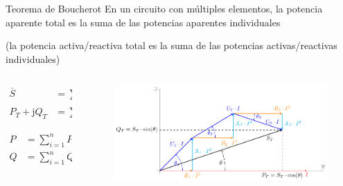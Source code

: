 \documentclass[aspectratio=169, usenames,svgnames,dvipsnames]{beamer}
\begin{document}
\begin{frame}{Teorema de Boucherot}
    \vspace{3mm}
    En un circuito con múltiples elementos, la potencia aparente total es la \alert{suma de las potencias aparentes individuales} 
    
    (la potencia activa/reactiva total es la \alert{suma de las potencias activas/reactivas individuales})
    
    \begin{columns}
    \begin{column}{0.3\columnwidth}
    
        \vspace{-8mm}
        
        \begin{align*}
          \overline{S} &= \sum_{i = 1}^{n} \overline{S}_i\\
          P_T + \mathrm{j}Q_T &= \sum^n_{i = 1} (P_i + \mathrm{j}Q_i)
        \end{align*}

        \vspace{-3mm}
        
        \begin{align*}
            P &= \sum_{i = 1}^n P_i\\
            Q &= \sum_{i = 1}^n Q_i
        \end{align*}
    \end{column}
    \begin{column}{0.7\linewidth}
        \begin{figure}
    
        \hspace*{-12mm}  \includegraphics[width=1.1\linewidth]{../figs/boucherot.pdf}
        \end{figure}
    \end{column}
    \end{columns}
\end{frame}
\end{document}

